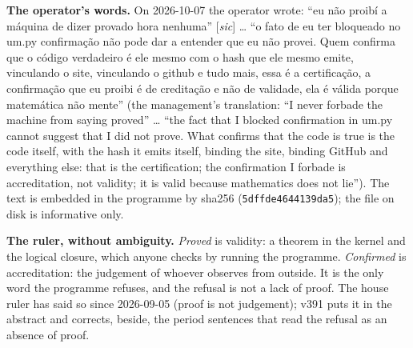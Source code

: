 \documentclass[11pt]{article}
\theoremstyle{definition}\newtheorem{deriv}{Derivation}
\begin{document}
\textbf{The operator's words.} On 2026-10-07 the operator wrote: ``eu não proibí a máquina de dizer provado hora nenhuma'' [\emph{sic}] … ``o fato de eu ter bloqueado no um.py confirmação não pode dar a entender que eu não provei. Quem confirma que o código verdadeiro é ele mesmo com o hash que ele mesmo emite, vinculando o site, vinculando o github e tudo mais, essa é a certificação, a confirmação que eu proibi é de creditação e não de validade, ela é válida porque matemática não mente'' (the management's translation: ``I never forbade the machine from saying proved'' … ``the fact that I blocked confirmation in um.py cannot suggest that I did not prove. What confirms that the code is true is the code itself, with the hash it emits itself, binding the site, binding GitHub and everything else: that is the certification; the confirmation I forbade is accreditation, not validity; it is valid because mathematics does not lie''). The text is embedded in the programme by sha256 (\texttt{5dffde4644139da5}); the file on disk is informative only.

\textbf{The ruler, without ambiguity.} \emph{Proved} is validity: a theorem in the kernel and the logical closure, which anyone checks by running the programme. \emph{Confirmed} is accreditation: the judgement of whoever observes from outside. It is the only word the programme refuses, and the refusal is not a lack of proof. The house ruler has said so since 2026-09-05 (proof is not judgement); v391 puts it in the abstract and corrects, beside, the period sentences that read the refusal as an absence of proof.
\end{document}
